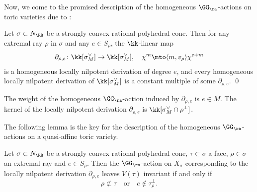 Now, we come to the promised description
of the homogeneous $\GG_\ra$-actions on toric varieties due to :

\begin{proposition}
\label{prop.G_a-actions_on_affine_toric_var}
Let $\sigma \subset N_\RR$ be a strongly convex rational polyhedral cone.
Then for any extremal ray $\rho$ in $\sigma$ and any
$e \in S_\rho$, the $\kk$-linear map
\[
\partial_{\rho, e} \colon \kk[\sigma^\vee_M] \to \kk[\sigma^\vee_M]
, \quad
\chi^m \mto \langle m, v_\rho \rangle \chi^{e+m}
\]
is a homogeneous locally nilpotent derivation of degree $e$,
and every homogeneous locally nilpotent derivation of $\kk[\sigma^\vee_M]$
is a constant multiple of some $\partial_{\rho, e}$. \qed
\end{proposition}

\begin{remark}
The weight of the homogeneous $\GG_\ra$-action induced by $\partial_{\rho, e}$ is $e \in M$.
The kernel of the locally nilpotent derivation $\partial_{\rho, e}$ is $\kk[\sigma_M^\vee \cap \rho^\bot]$.
\end{remark}

The following lemma is the key for the description of the homogeneous $\GG_\ra$-actions on a
quasi-affine toric variety.

\begin{proposition}
\label{Prop:Orbit_closure_invariant}
Let $\sigma \subset N_{\RR}$ be a strongly convex rational polyhedral cone, $\tau \subset \sigma$ a face,
$\rho \in \sigma$ an extremal ray and $e \in S_\rho$. Then the
$\GG_\ra$-action on $X_\sigma$ corresponding to the locally nilpotent derivation $\partial_{\rho, e}$
leaves $V(\tau)$ invariant if and only if
\[
\rho \not\subset \tau \quad \textrm{or} \quad e \not\in \tau_{\rho}^\bot.
\]
\end{proposition}

